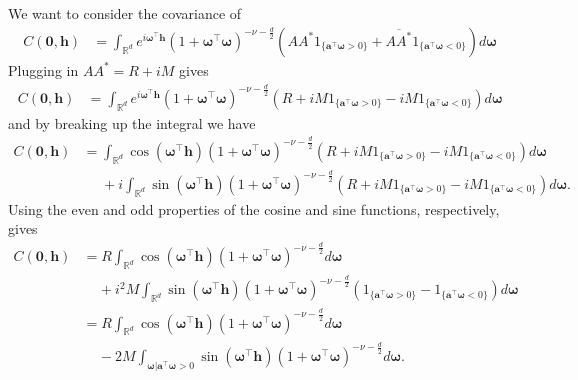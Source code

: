 \documentclass[11pt]{article}
\newcommand{\vlen}{\boldsymbol{h}}
\newcommand{\vint}{\boldsymbol{\omega}}
\newcommand{\vpla}{\boldsymbol{a}}
\begin{document}
We want to consider the covariance of \begin{align*}
C(\boldsymbol{0}, \boldsymbol{h}) &= \int_{\mathbb{R}^d} e^{i \vint^\top \vlen} (1 +\vint^\top \vint )^{-\nu- \frac{d}{2}} \left(AA^* 1_{\{\vpla^\top \vint > 0\}} + \overline{AA^*} 1_{\{\vpla^\top\vint < 0\}}\right) d\vint%
\end{align*}
Plugging in $AA^* = R + iM$ gives
\begin{align*}
C(\boldsymbol{0}, \boldsymbol{h})&=\int_{\mathbb{R}^d} e^{i \vint^\top \boldsymbol{h}}(1 + \vint^\top \vint)^{-\nu- \frac{d}{2}} \left(R + iM1_{\{\vpla^\top\vint > 0\}}  - iM1_{\{\vpla^\top\vint < 0\}}\right) d\vint\end{align*}
and by breaking up the integral we have
\begin{align*}
C(\boldsymbol{0}, \boldsymbol{h})%
&=\int_{\mathbb{R}^d}\cos(\vint^\top \boldsymbol{h})(1 + \vint^\top \vint)^{-\nu- \frac{d}{2}} \left(R + iM1_{\{\vpla^\top\vint > 0\}}  - iM1_{\{\vpla^\top\vint < 0\}}\right) d\vint \\
&\ \ \ \ \ \ +i\int_{\mathbb{R}^d}\sin(\vint^\top \boldsymbol{h})(1 + \vint^\top \vint)^{-\nu- \frac{d}{2}} \left(R + iM1_{\{\vpla^\top\vint > 0\}}  - iM1_{\{\vpla^\top\vint < 0\}}\right) d\vint.\end{align*}
Using the even and odd properties of the cosine and sine functions, respectively, gives
\begin{align*}
C(\boldsymbol{0}, \boldsymbol{h})&=R\int_{\mathbb{R}^d}\cos(\vint^\top \boldsymbol{h})(1 + \vint^\top \vint)^{-\nu- \frac{d}{2}} d\vint \\
& \ \ \ \ \ + i^2M\int_{\mathbb{R}^d}\sin(\vint^\top \boldsymbol{h})(1 + \vint^\top \vint)^{-\nu- \frac{d}{2}} \left(1_{\{\vpla^\top\vint > 0\}}  - 1_{\{\vpla^\top\vint < 0\}}\right) d\vint \\
&=R\int_{\mathbb{R}^d}\cos(\vint^\top \boldsymbol{h})(1 + \vint^\top \vint)^{-\nu- \frac{d}{2}} d\vint \\
& \ \ \ \ \ -2M\int_{\vint | \vpla^\top\vint > 0}\sin(\vint^\top \boldsymbol{h})(1 + \vint^\top \vint)^{-\nu- \frac{d}{2}} d\vint .
\end{align*}
\end{document}

